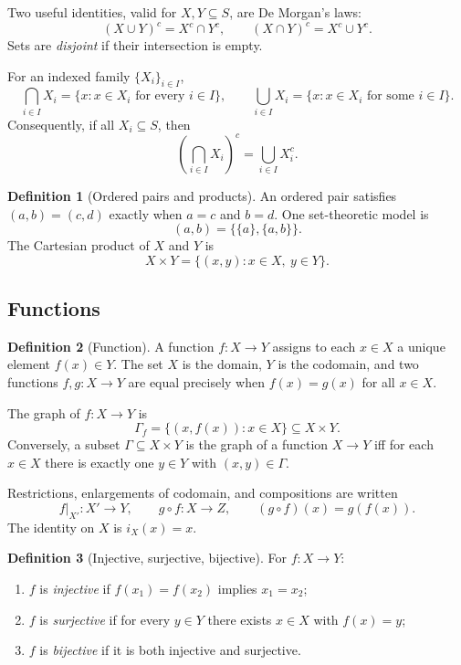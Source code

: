\documentclass{article}
\theoremstyle{definition}
\newtheorem{definition}{Definition}[section]
\theoremstyle{plain}
\begin{document}
Two useful identities, valid for $X,Y\subseteq S$, are De Morgan's laws:
\[
	(X\cup Y)^c=X^c\cap Y^c,
	\qquad
	(X\cap Y)^c=X^c\cup Y^c.
\]
Sets are \emph{disjoint} if their intersection is empty.

For an indexed family $\{X_i\}_{i\in I}$,
\[
	\bigcap_{i\in I}X_i=\{x:x\in X_i\text{ for every }i\in I\},
	\qquad
	\bigcup_{i\in I}X_i=\{x:x\in X_i\text{ for some }i\in I\}.
\]
Consequently, if all $X_i\subseteq S$, then
\[
	\left(\bigcap_{i\in I}X_i\right)^c=\bigcup_{i\in I}X_i^c.
\]

\begin{definition}[Ordered pairs and products]\label{def:orderedpair}
An ordered pair satisfies $(a,b)=(c,d)$ exactly when $a=c$ and $b=d$.  One set-theoretic model is
\[
	(a,b)=\{\{a\},\{a,b\}\}.
\]
The Cartesian product of $X$ and $Y$ is
\[
	X\times Y=\{(x,y):x\in X,\ y\in Y\}.
\]
\end{definition}

\subsection{Functions}\label{subsec:functions}
\begin{definition}[Function]\label{def:function}
A function $f:X\to Y$ assigns to each $x\in X$ a unique element $f(x)\in Y$.  The set $X$ is the domain, $Y$ is the codomain, and two functions $f,g:X\to Y$ are equal precisely when $f(x)=g(x)$ for all $x\in X$.
\end{definition}

The graph of $f:X\to Y$ is
\[
	\Gamma_f=\{(x,f(x)):x\in X\}\subseteq X\times Y.
\]
Conversely, a subset $\Gamma\subseteq X\times Y$ is the graph of a function $X\to Y$ iff for each $x\in X$ there is exactly one $y\in Y$ with $(x,y)\in\Gamma$.

Restrictions, enlargements of codomain, and compositions are written
\[
	f|_{X'}:X'\to Y,
	\qquad
	g\circ f:X\to Z,
	\qquad
	(g\circ f)(x)=g(f(x)).
\]
The identity on $X$ is $i_X(x)=x$.

\begin{definition}[Injective, surjective, bijective]\label{def:bijective}
For $f:X\to Y$:
\begin{enumerate}[label=(\roman*)]
	\item $f$ is \emph{injective} if $f(x_1)=f(x_2)$ implies $x_1=x_2$;
	\item $f$ is \emph{surjective} if for every $y\in Y$ there exists $x\in X$ with $f(x)=y$;
	\item $f$ is \emph{bijective} if it is both injective and surjective.
\end{enumerate}
\end{definition}
\end{document}
